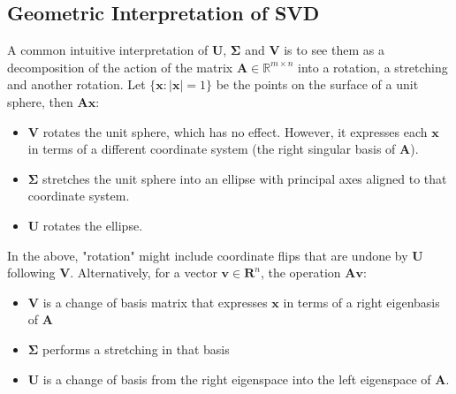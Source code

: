 \subsection{Geometric Interpretation of SVD}
A common intuitive interpretation of $\mathbf{U}$, $\mathbf{\Sigma}$ and $\mathbf{V}$ is to see them as a decomposition of the action of the matrix $\mathbf{A}\in\mathbb{R}^{m\times n}$ into a rotation, a stretching and another rotation. Let $\{\mathbf{x} : |\mathbf{x}|=1 \}$ be the points on the surface of a unit sphere, then $\mathbf{Ax}$:

\begin{itemize}
\item $\mathbf{V}$ rotates the unit sphere, which has no effect. However, it expresses each $\mathbf{x}$ in terms of a different coordinate system (the right singular basis of $\mathbf{A}$). 
\item $\mathbf{\Sigma}$ stretches the unit sphere into an ellipse with principal axes aligned to that coordinate system.
\item $\mathbf{U}$ rotates the ellipse.
\end{itemize}

In the above, "rotation" might include coordinate flips that are undone by $\mathbf{U}$ following $\mathbf{V}$. Alternatively, for a vector $\mathbf{v}\in\mathbf{R}^{n}$, the operation $\mathbf{Av}$:

\begin{itemize}
\item $\mathbf{V}$ is a change of basis matrix that expresses $\mathbf{x}$ in terms of a right eigenbasis of $\mathbf{A}$
\item $\mathbf{\Sigma}$ performs a stretching in that basis
\item $\mathbf{U}$ is a change of basis from the right eigenspace into the left eigenspace of $\mathbf{A}$. 
\end{itemize}

